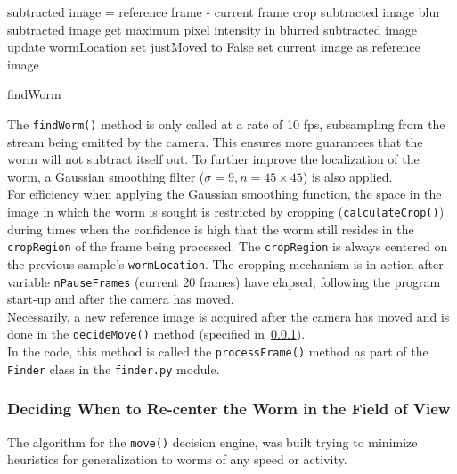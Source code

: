 \documentclass[main.tex]{subfiles}
\begin{document}
\begin{algorithm}[h]
    {
        {
            subtracted image = reference frame - current frame\;
            {
                crop subtracted image\;
            }
            {        
                blur subtracted image\;
                get maximum pixel intensity in blurred subtracted image\;
                update wormLocation\;
                set justMoved to False\;
            }   
    }{
    set current image as reference image\;}
}
\caption{findWorm}
\end{algorithm}

The \verb|findWorm()| method is only called at a rate of 10 fps, subsampling from the stream being emitted by the camera. This ensures more guarantees that the worm will not subtract itself out. To further improve the localization of the worm, a Gaussian smoothing filter ($\sigma = 9, n = 45 \times 45$) is also applied.\\ 

For efficiency when applying the Gaussian smoothing function, the space in the image in which the worm is sought is restricted by cropping (\verb|calculateCrop()|) during times when the confidence is high that the worm still resides in the \verb|cropRegion| of the frame being processed. The \verb|cropRegion| is always centered on the previous sample's \verb|wormLocation|. The cropping mechanism is in action after variable \verb|nPauseFrames| (current 20 frames) have elapsed, following the program start-up and after the camera has moved.\\

Necessarily, a new reference image is acquired after the camera has moved and is done in the \verb|decideMove()| method (specified in~\ref{ss:center}). \\

In the code, this method is called the \verb|processFrame()| method as part of the \verb|Finder| class in the \verb|finder.py| module. 

\clearpage
\subsubsection{Deciding When to Re-center the Worm in the Field of View}
\label{ss:center}
The algorithm for the \verb|move()| decision engine, was built trying to minimize heuristics for generalization to worms of any speed or activity. \\
\end{document}
